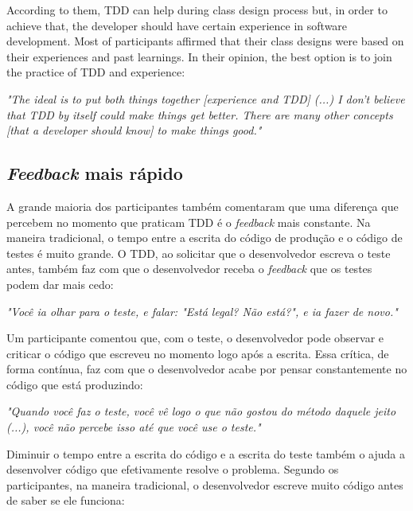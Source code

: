 \documentclass[conference]{IEEEtran}
\begin{document}
According to them, TDD can help during class design process but, in order to achieve that,
the developer should have certain experience in software development. Most of participants
affirmed that their class designs were based on their experiences and past learnings.
In their opinion, the best option is to join the practice of TDD and experience:

\begin{framed}

	\textit{"The ideal is to put both things together [experience and TDD] (...) 
	I don't believe that TDD by itself could make things get better. There are many other
	concepts [that a developer should know] to make things good."}

\end{framed}

\subsection{\textit{Feedback} mais rápido}

A grande maioria dos participantes também comentaram que uma diferença que percebem
no momento que praticam TDD é o \textit{feedback} mais constante. Na maneira
tradicional, o tempo entre a escrita do código de produção e o código
de testes é muito grande. O TDD, ao solicitar que o desenvolvedor
escreva o teste antes, também faz com que o desenvolvedor receba o \textit{feedback} que
os testes podem dar mais cedo:

\begin{framed}
\textit{"Você ia olhar para o teste, e falar: "Está legal? Não está?", e ia fazer de novo."}
\end{framed}

Um participante comentou que, com o teste, o desenvolvedor pode observar
e criticar o código que escreveu no momento logo após a escrita.
Essa crítica, de forma contínua, faz com que o desenvolvedor acabe
por pensar constantemente no código que está produzindo:

\begin{framed}
\textit{"Quando você faz o teste, você vê logo o que não gostou do método daquele jeito (...), você
não percebe isso até que você use o teste."}
\end{framed}

Diminuir o tempo entre a escrita do código e a escrita do teste também o ajuda a desenvolver código
que efetivamente resolve o problema. Segundo os participantes, na maneira tradicional, 
o desenvolvedor escreve muito código antes de saber se ele funciona:
\end{document}
